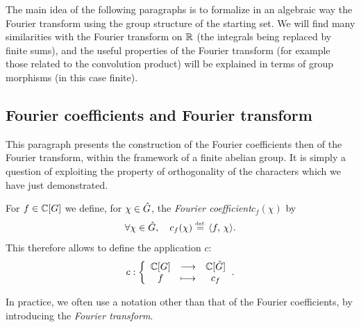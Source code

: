 The main idea of the following paragraphs is to formalize in an algebraic way the Fourier transform using the group structure of the starting set. We will find many similarities with the Fourier transform on $\mathbb{R} $ (the integrals being replaced by finite sums), and the useful properties of the Fourier transform (for example those related to the convolution product) will be explained in terms of group morphisms (in this case finite).
\subsection{Fourier coefficients and Fourier transform}
\label{sect2-coef-fourier-transforme-fourier}

This paragraph presents the construction of the Fourier coefficients then of the Fourier transform, within the framework of a finite abelian group. It is simply a question of exploiting the property of orthogonality of the characters which we have just demonstrated.

\begin{defn}
 \label{notation-21} For $ f \in \mathbb{C}[G]$ we define, for $\chi \in \hat{G}$, the \textit{Fourier coefficient}$ c_f(\chi)$ by
\begin{equation*}
\forall \chi \in \hat{G}, \quad c_{f}(\chi) \stackrel{\mbox{\upshape\tiny def.}}{=} \langle f,\,\chi\rangle.
\end{equation*}
This therefore allows to define the application $ c $:
\begin{equation*}
c: {\left\{ \begin{array}{ccc} \mathbb{C}[G] & \longrightarrow & \mathbb{C}[\hat{G}] \\ f & \longmapsto & c_f \end{array} \right.}.
\end{equation*}

\end{defn}
In practice, we often use a notation other than that of the Fourier coefficients, by introducing the \textit{Fourier transform}.

